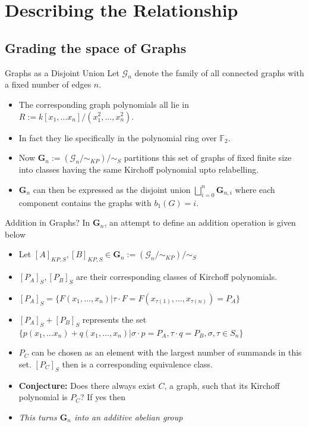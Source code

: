 \documentclass{beamer}
\def\field{\mathbb{F}} %
\begin{document}
\section{Describing the Relationship}
\subsection{Grading the space of Graphs}
\begin{frame}{Graphs as a Disjoint Union}
    Let $\mathcal{G}_n$ denote the family of all connected graphs with a fixed number of edges $n$. \begin{itemize}
        \item<1->The corresponding graph polynomials all lie in $R:= k[x_1, \ldots x_n]/(x_1^2, \ldots, x_n^2)$.
        \item<2->In fact they lie specifically in the polynomial ring over $\field_2$.
        \item<3-> Now $\mathbf{G}_n:= (\mathcal{G}_n/\sim_{KP})/\sim_S$ partitions this set of graphs of fixed finite size into classes having the same Kirchoff polynomial upto relabelling.
        \item<4-> $\mathbf{G}_n$ can then be expressed as the disjoint union $\bigsqcup_{i=0}^n \mathbf{G}_{n,i}$ where each component contains the graphs with $b_1(G) = i$.
    \end{itemize} 
\end{frame}
\begin{frame}{Addition in Graphs?}
    In $\mathbf{G}_n$, an attempt to define an addition operation is given below 
    \begin{itemize}
        \item<1-> Let $[A]_{KP, S}, [B]_{KP, S} \in \mathbf{G}_n := (\mathcal{G}_n/\sim_{KP})/\sim_S$
        \item<2->$[P_A]_S, [P_B]_S$ are their corresponding classes of Kirchoff polynomials.
        \item<3->$[P_A]_S = \{F(x_1, \ldots, x_n)| \tau \cdot F = F(x_{\tau(1)}, \ldots, x_{\tau(n)}) = P_A\}$
        \item<4-> $[P_A]_S + [P_B]_S$ represents the set $\{p(x_1, \ldots x_n) + q(x_1, \ldots, x_n) | \sigma \cdot p = P_A, \tau \cdot q = P_B, \sigma, \tau \in S_n\}$
        \item<5-> $P_C$ can be chosen as an element with the largest number of summands in this set. $[P_C]_S$ then is a corresponding equivalence class.
        \item<6-> \textbf{Conjecture:} Does there always exist $C$, a graph, such that its Kirchoff polynomial is $P_C$? If yes then
        \item<6-> \textit{This turns $\mathbf{G}_n$ into an additive abelian group}
    \end{itemize}
\end{frame}
\end{document}
